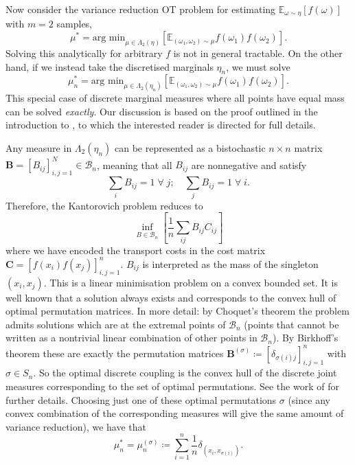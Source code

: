 Now consider the variance reduction OT problem for estimating $\mathbb{E}_{\omega \sim \eta}[f(\omega)]$ with $m=2$ samples,
\begin{equation} \label{eq:ot_formulation_asymptotic}
    \mu^* = \textrm{arg min}_{\mu \in \Lambda_2(\eta)} \left [ \mathbb{E}_{(\omega_1, \omega_2) \sim \mu}  f(\omega_1)f(\omega_2) \right].
\end{equation}
Solving this analytically for arbitrary $f$ is not in general tractable. 
On the other hand, if we instead take the discretised marginals $\eta_n$, we must solve
\begin{equation} \label{eq:ot_formulation_asymptotic_discrete}
    \mu_n^* = \textrm{arg min}_{\mu \in \Lambda_2(\eta_n)} \left [ \mathbb{E}_{(\omega_1, \omega_2) \sim \mu}  f(\omega_1)f(\omega_2) \right].
\end{equation}
This special case of discrete marginal measures where all points have equal mass can be solved \emph{exactly}. 
Our discussion is based on the proof outlined in the introduction to \citet{villani2021topics}, to which the interested reader is directed for full details.

Any measure in $\Lambda_2(\eta_n)$ can be represented as a bistochastic $n \times n$ matrix $\mathbf{B} = [B_{ij}]_{i,j=1}^N \in \mathcal{B}_n$, meaning that all $B_{ij}$ are nonnegative and satisfy
\begin{equation}
    \sum_i B_{ij} = 1 \; \forall \; j;   \quad \sum_j B_{ij} = 1 \; \forall \; i.
\end{equation}
Therefore, the Kantorovich problem reduces to
\begin{equation}
    \inf_{B \in \mathcal{B}_n} \left [ \frac{1}{n} \sum_{ij} B_{ij} C_{ij} \right ]
\end{equation}
where we have encoded the transport costs in the cost matrix $\mathbf{C}= [f(x_i)f(x_j)]_{i,j=1}^n$.  
$B_{ij}$ is interpreted as the mass of the singleton $(x_i,x_j)$. 
This is a linear minimisation problem on a convex bounded set. 
It is well known that a solution always exists and corresponds to the convex hull of optimal permutation matrices. 
In more detail: by Choquet's theorem the problem admits solutions which are at the extremal points of $\mathcal{B}_n$ (points that cannot be written as a nontrivial linear combination of other points in $\mathcal{B}_n$). 
By Birkhoff's theorem these are exactly the permutation matrices $\mathbf{B}^{(\sigma)} \coloneqq [\delta_{\sigma(i)j}]_{i,j=1}^n$ with $\sigma \in S_n$. 
So the optimal discrete coupling is the convex hull of the discrete joint measures corresponding to the set of optimal permutations.
See the work of \citet{villani2021topics} for further details.
Choosing just one of these optimal permutations $\sigma$ (since any convex combination of the corresponding measures will give the same amount of variance reduction), we have that
\begin{equation}
    \mu_n^* = \mu_n^{(\sigma)} \coloneqq \sum_{i=1}^n \frac{1}{n} \delta_{(x_i, x_{\sigma(i)})}. 
\end{equation}

